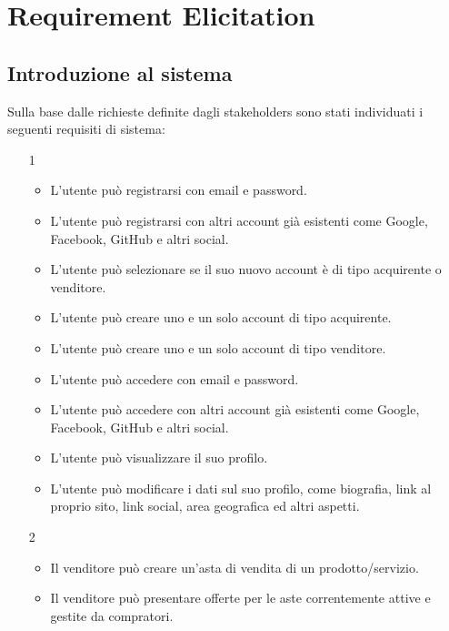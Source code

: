 
\chapter{Requirement Elicitation}
     \section{Introduzione al sistema} %
        Sulla base dalle richieste definite dagli stakeholders sono stati individuati i seguenti requisiti di sistema:
        
        \begin{itemize}
            \item[1]
                \begin{itemize}
                    \item L'utente può registrarsi con email e password.
                    \item L'utente può registrarsi con altri account già esistenti come Google, Facebook, GitHub e altri social.
                    \item L'utente può selezionare se il suo nuovo account è di tipo acquirente o venditore.
                    \item L'utente può creare uno e un solo account di tipo acquirente.
                    \item L'utente può creare uno e un solo account di tipo venditore.
                    \item L'utente può accedere con email e password.
                    \item L'utente può accedere con altri account già esistenti come Google, Facebook, GitHub e altri social.
                    \item L'utente può visualizzare il suo profilo.
                    \item L'utente può modificare i dati sul suo profilo, come biografia, link al proprio sito, link social, area geografica ed altri aspetti.
                \end{itemize}
            \item[2] 
                \begin{itemize}
                    \item Il venditore può creare un'asta di vendita di un prodotto/servizio.
                    \item Il venditore può presentare offerte per le aste correntemente attive e gestite da compratori.

\end{itemize}
\end{itemize}
